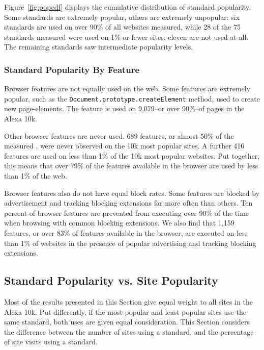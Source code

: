 Figure~\ref{fig:popcdf} displays the cumulative distribution of standard
popularity. Some standards are extremely popular, others are extremely
unpopular: six standards are used on over 90\% of all websites measured, while
28 of the 75 standards measured were used on 1\% or fewer sites;
eleven are not used at all. The remaining standards saw intermediate
popularity levels.


\subsubsection{Standard Popularity By Feature}
Browser features are not equally used on the web.  Some features are extremely
popular, such as the \texttt{Document.prototype.createElement} method,
used to create new page-elements.  The feature is used on 9,079--or over
90\%--of pages in the Alexa 10k.

Other browser features are never used.  689 features, or almost 50\% of the
measured \numfeatures, were never observed on the 10k most popular
sites.  A further 416 features are used on less than 1\% of the 10k most
popular websites.  Put together, this means that over 79\% of the features
available in the browser are used by less than 1\% of the web.

Browser features also do not have equal block rates. Some features
are blocked by advertisement and tracking blocking extensions far more often
than others.  Ten percent of browser features are prevented from executing over
90\% of the time when browsing with common blocking extensions.   We also find
that 1,159 features, or over 83\% of features available in the browser, are
executed on less than 1\% of websites in the presence of popular advertising
and tracking blocking extensions.


\subsection{Standard Popularity vs. Site Popularity}
\label{sec:results-feat-pop-by-site-pop}



Most of the results presented in this Section give equal weight to all sites in
the Alexa 10k.  Put differently, if the most popular and least popular sites use the same
standard, both uses are given equal consideration.  This Section considers
the difference between the number of sites using a standard, and the
percentage of site visits using a standard.


